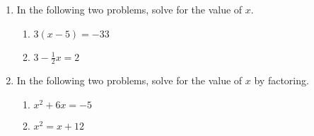 \documentclass[12pt, twoside]{article}
\begin{document}
\begin{enumerate}
\newpage
\item In the following two problems, solve for the value of $x$.
\begin{multicols}{2}
  \begin{enumerate}
    \item   $3(x-5)=-33$ \vspace{6cm}
    \item   $3-\frac{1}{2} x=2$ \vspace{6cm}
  \end{enumerate}
\end{multicols}

\item In the following two problems, solve for the value of $x$ by factoring.
  \begin{multicols}{2}
    \begin{enumerate}
      \item   $x^2+6x=-5$ \vspace{6cm}
      \item   $x^2=x+12$ \vspace{6cm}
    \end{enumerate}
  \end{multicols}

\end{enumerate}
\end{document}
